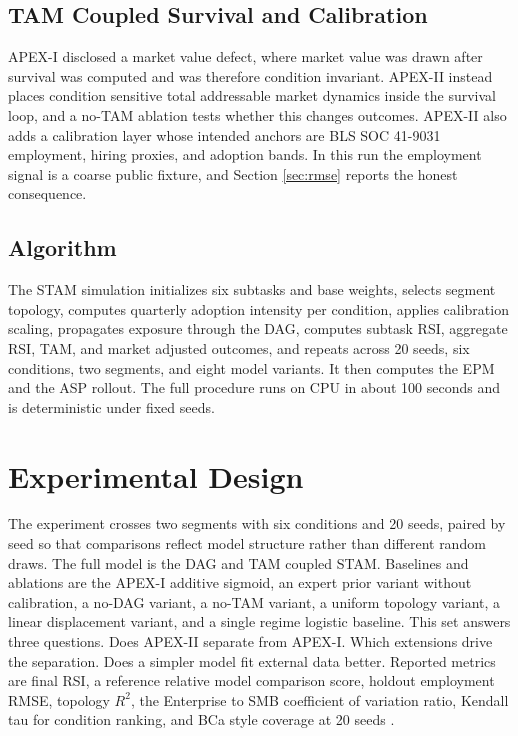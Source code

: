 \documentclass[10pt,conference]{IEEEtran}
\begin{document}
\subsection{TAM Coupled Survival and Calibration}
\label{sec:calib}
APEX-I disclosed a market value defect, where market value was drawn after survival was computed and was therefore condition invariant. APEX-II instead places condition sensitive total addressable market dynamics inside the survival loop, and a no-TAM ablation tests whether this changes outcomes. APEX-II also adds a calibration layer whose intended anchors are BLS SOC 41-9031 employment, hiring proxies, and adoption bands. In this run the employment signal is a coarse public fixture, and Section \ref{sec:rmse} reports the honest consequence.

\subsection{Algorithm}
The STAM simulation initializes six subtasks and base weights, selects segment topology, computes quarterly adoption intensity per condition, applies calibration scaling, propagates exposure through the DAG, computes subtask RSI, aggregate RSI, TAM, and market adjusted outcomes, and repeats across 20 seeds, six conditions, two segments, and eight model variants. It then computes the EPM and the ASP rollout. The full procedure runs on CPU in about 100 seconds and is deterministic under fixed seeds.

\section{Experimental Design}
The experiment crosses two segments with six conditions and 20 seeds, paired by seed so that comparisons reflect model structure rather than different random draws. The full model is the DAG and TAM coupled STAM. Baselines and ablations are the APEX-I additive sigmoid, an expert prior variant without calibration, a no-DAG variant, a no-TAM variant, a uniform topology variant, a linear displacement variant, and a single regime logistic baseline. This set answers three questions. Does APEX-II separate from APEX-I. Which extensions drive the separation. Does a simpler model fit external data better. Reported metrics are final RSI, a reference relative model comparison score, holdout employment RMSE, topology $R^2$, the Enterprise to SMB coefficient of variation ratio, Kendall tau for condition ranking, and BCa style coverage at 20 seeds \cite{lakens2022sample,lakens2021simulation}.
\end{document}
